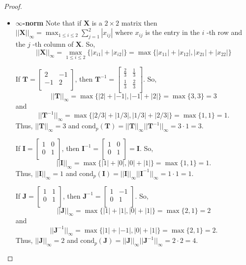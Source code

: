\documentclass[12pt]{article}
\theoremstyle{definition}
\newcommand{\vect}[1]{\boldsymbol{#1}}
\begin{document}
\begin{proof}
\begin{itemize}
    \item \textbf{$\infty$-norm} Note that if $\vect{X}$ is a $2 \times 2$ matrix then
      $||\vect{X}||_\infty = \max_{1\leq i \leq 2}{\sum_{j=1}^2 |x_{ij}|}$ where $x_{ij}$ is the
      entry in the $i$ -th row and the $j$ -th column of $\vect{X}$. So,
      $$||\vect{X}||_\infty = \max_{1\leq i \leq 2}{\{|x_{i1}| + |x_{i2}|\}} = \max{\{ |x_{11}| + |x_{12}|, |x_{21}| + |x_{22}| \}}$$

      If $\vect{T} = \begin{bmatrix}2 & -1 \\ -1 & 2 \\\end{bmatrix}$, then
      $\vect{T}^{-1} = \begin{bmatrix}\frac{2}{3} & \frac{1}{3} \\ \frac{1}{3} & \frac{2}{3} \\\end{bmatrix}$.
      So, $$||\vect{T}||_\infty = \max{\{ |2| + |-1|, |-1| + |2| \}} = \max{\{ 3, 3\}} = 3$$ and
      $$||\vect{T}^{-1}||_\infty = \max{\{ |2/3| + |1/3|, |1/3| + |2/3| \}} = \max{\{ 1, 1\}} = 1.$$
      Thus, $||\vect{T}||_\infty = 3$ and $\text{cond}_p(\vect{T}) = ||\vect{T}||_\infty ||\vect{T}^{-1}||_\infty = 3 \cdot 1 = 3$.

      If $\vect{I} = \begin{bmatrix}1 & 0 \\ 0 & 1 \\\end{bmatrix}$, then
      $\vect{I}^{-1} = \begin{bmatrix}1 & 0 \\ 0 & 1\\\end{bmatrix} = \vect{I}$.
      So, $$||\vect{I}||_\infty = \max{\{ |1| + |0|, |0| + |1| \}} = \max{\{ 1, 1\}} = 1.$$
      Thus, $||\vect{I}||_\infty = 1$ and $\text{cond}_p(\vect{I}) = ||\vect{I}||_\infty ||\vect{I}^{-1}||_\infty = 1 \cdot 1 = 1$.

      If $\vect{J} = \begin{bmatrix}1 & 1 \\ 0 & 1 \\\end{bmatrix}$, then
      $\vect{J}^{-1} = \begin{bmatrix}1 & -1 \\ 0 & 1 \\\end{bmatrix}$.
      So, $$||\vect{J}||_\infty = \max{\{ |1| + |1|, |0| + |1| \}} = \max{\{ 2, 1\}} = 2$$ and
      $$||\vect{J}^{-1}||_\infty = \max{\{ |1| + |-1|, |0| + |1| \}} = \max{\{ 2, 1\}} = 2.$$
      Thus, $||\vect{J}||_\infty = 2$ and $\text{cond}_p(\vect{J}) = ||\vect{J}||_\infty ||\vect{J}^{-1}||_\infty = 2 \cdot 2 = 4$.
  \end{itemize}

\end{proof}
\end{document}

